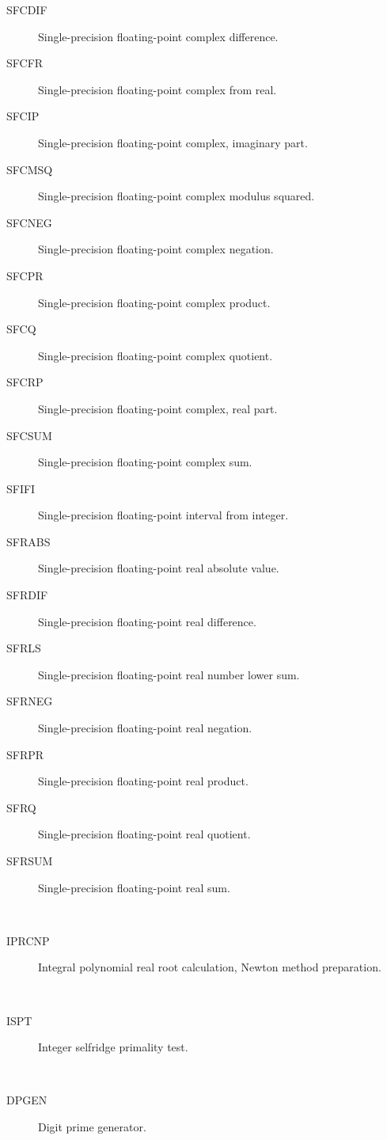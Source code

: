 \begin{description}
\begin{description}
  \item[SFCDIF]  Single-precision floating-point complex difference.
  \item[SFCFR]  Single-precision floating-point complex from real.
  \item[SFCIP]  Single-precision floating-point complex, imaginary part.
  \item[SFCMSQ]  Single-precision floating-point complex modulus squared.
  \item[SFCNEG]  Single-precision floating-point complex negation.
  \item[SFCPR]  Single-precision floating-point complex product.
  \item[SFCQ]  Single-precision floating-point complex quotient.
  \item[SFCRP]  Single-precision floating-point complex, real part.
  \item[SFCSUM]  Single-precision floating-point complex sum.
  \item[SFIFI]  Single-precision floating-point interval from integer.
  \item[SFRABS]  Single-precision floating-point real absolute value.
  \item[SFRDIF]  Single-precision floating-point real difference.
  \item[SFRLS]  Single-precision floating-point real number lower sum.
  \item[SFRNEG]  Single-precision floating-point real negation.
  \item[SFRPR]  Single-precision floating-point real product.
  \item[SFRQ]  Single-precision floating-point real quotient.
  \item[SFRSUM]  Single-precision floating-point real sum.
  \end{description}
\item[preparation] \ \ 
  \begin{description}
  \item[IPRCNP]  Integral polynomial real root calculation, Newton method
    preparation.
  \end{description}
\item[primality] \ \ 
  \begin{description}
  \item[ISPT]  Integer selfridge primality test.
  \end{description}
\item[prime] \ \ 
  \begin{description}
  \item[DPGEN]  Digit prime generator.

\end{description}
\end{description}
